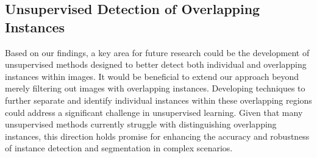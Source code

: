 \subsection{Unsupervised Detection of Overlapping Instances}
Based on our findings, a key area for future research could be the development of unsupervised methods designed to better detect both individual and overlapping instances within images. It would be beneficial to extend our approach beyond merely filtering out images with overlapping instances. Developing techniques to further separate and identify individual instances within these overlapping regions could address a significant challenge in unsupervised learning. Given that many unsupervised methods currently struggle with distinguishing overlapping instances, this direction holds promise for enhancing the accuracy and robustness of instance detection and segmentation in complex scenarios.


